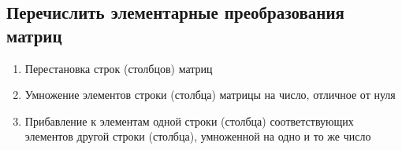 \subsection{Перечислить элементарные преобразования матриц}
\begin{mdframed}[style=Teal, frametitle={Элементарные преобразования матриц:}]
	\begin{enumerate}
		\item Перестановка строк (столбцов) матриц
		\item Умножение элементов строки (столбца) матрицы на число, отличное от нуля
		\item Прибавление к элементам одной строки (столбца) соответствующих элементов другой строки (столбца), умноженной на одно и то же число
	\end{enumerate}
\end{mdframed}


